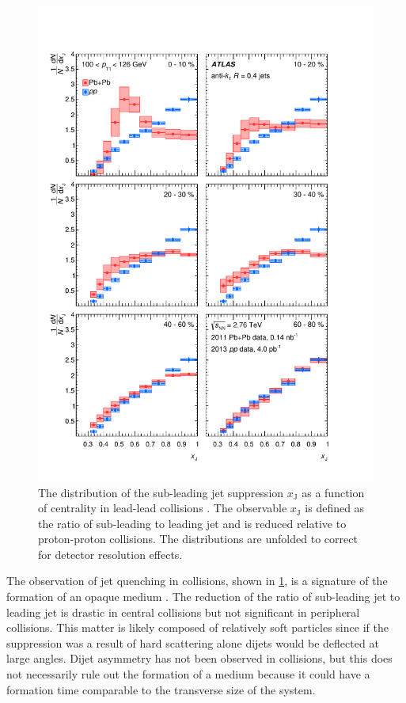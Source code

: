\begin{figure}[t]
  \includegraphics{dijet_asym.pdf}
  \caption{The distribution of the sub-leading jet suppression $x_\textrm{J}$ as a function of centrality in lead-lead collisions \cite{HION-2012-11}. The observable $x_\textrm{J}$ is defined as the ratio of sub-leading to leading jet \pt and is reduced relative to proton-proton collisions. The distributions are unfolded to correct for detector resolution effects.}
  \label{fig:dijet_asym}
\end{figure}

The observation of jet quenching in \PbPb collisions, shown in \cref{fig:dijet_asym}, is a signature of the formation of an opaque medium \cite{HION-2012-11}.
The reduction of the ratio of sub-leading jet \pt to leading jet \pt is drastic in central collisions but not significant in peripheral collisions.
This matter is likely composed of relatively soft particles since if the suppression was a result of hard scattering alone dijets would be deflected at large angles.
Dijet asymmetry has not been observed in \pA collisions, but this does not necessarily rule out the formation of a medium because it could have a formation time comparable to the transverse size of the system.

